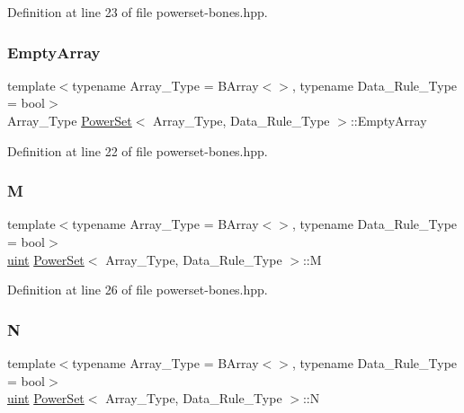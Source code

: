 Definition at line 23 of file powerset-\/bones.\+hpp.

\mbox{\label{class_power_set_a367db2c97e0301dd0dd78e5e4b458d34}} 
\subsubsection{\texorpdfstring{Empty\+Array}{EmptyArray}}
{\footnotesize\ttfamily template$<$typename Array\+\_\+\+Type  = B\+Array$<$$>$, typename Data\+\_\+\+Rule\+\_\+\+Type  = bool$>$ \\
Array\+\_\+\+Type \hyperlink{class_power_set}{Power\+Set}$<$ Array\+\_\+\+Type, Data\+\_\+\+Rule\+\_\+\+Type $>$\+::Empty\+Array}



Definition at line 22 of file powerset-\/bones.\+hpp.

\mbox{\label{class_power_set_a91d328d5ace1ed6a8587a66af905ae98}} 
\subsubsection{\texorpdfstring{M}{M}}
{\footnotesize\ttfamily template$<$typename Array\+\_\+\+Type  = B\+Array$<$$>$, typename Data\+\_\+\+Rule\+\_\+\+Type  = bool$>$ \\
\hyperlink{typedefs_8hpp_a91ad9478d81a7aaf2593e8d9c3d06a14}{uint} \hyperlink{class_power_set}{Power\+Set}$<$ Array\+\_\+\+Type, Data\+\_\+\+Rule\+\_\+\+Type $>$\+::M}



Definition at line 26 of file powerset-\/bones.\+hpp.

\mbox{\label{class_power_set_ab3b65c1b9bce012f4aabe5acae093acd}} 
\subsubsection{\texorpdfstring{N}{N}}
{\footnotesize\ttfamily template$<$typename Array\+\_\+\+Type  = B\+Array$<$$>$, typename Data\+\_\+\+Rule\+\_\+\+Type  = bool$>$ \\
\hyperlink{typedefs_8hpp_a91ad9478d81a7aaf2593e8d9c3d06a14}{uint} \hyperlink{class_power_set}{Power\+Set}$<$ Array\+\_\+\+Type, Data\+\_\+\+Rule\+\_\+\+Type $>$\+::N}



